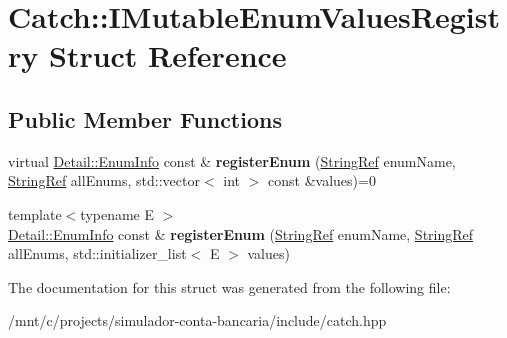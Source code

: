 \hypertarget{structCatch_1_1IMutableEnumValuesRegistry}{}\section{Catch\+:\+:I\+Mutable\+Enum\+Values\+Registry Struct Reference}
\label{structCatch_1_1IMutableEnumValuesRegistry}
\subsection*{Public Member Functions}
\begin{DoxyCompactItemize}
\item 
\mbox{\label{structCatch_1_1IMutableEnumValuesRegistry_a948e66e85f5b66ab68256d50bfe548f4}} 
virtual \hyperlink{structCatch_1_1Detail_1_1EnumInfo}{Detail\+::\+Enum\+Info} const  \& {\bfseries register\+Enum} (\hyperlink{classCatch_1_1StringRef}{String\+Ref} enum\+Name, \hyperlink{classCatch_1_1StringRef}{String\+Ref} all\+Enums, std\+::vector$<$ int $>$ const \&values)=0
\item 
\mbox{\label{structCatch_1_1IMutableEnumValuesRegistry_a60e4546c6fd45f9be68e43410403b562}} 
{\footnotesize template$<$typename E $>$ }\\\hyperlink{structCatch_1_1Detail_1_1EnumInfo}{Detail\+::\+Enum\+Info} const  \& {\bfseries register\+Enum} (\hyperlink{classCatch_1_1StringRef}{String\+Ref} enum\+Name, \hyperlink{classCatch_1_1StringRef}{String\+Ref} all\+Enums, std\+::initializer\+\_\+list$<$ E $>$ values)
\end{DoxyCompactItemize}


The documentation for this struct was generated from the following file\+:\begin{DoxyCompactItemize}
\item 
/mnt/c/projects/simulador-\/conta-\/bancaria/include/catch.\+hpp\end{DoxyCompactItemize}

